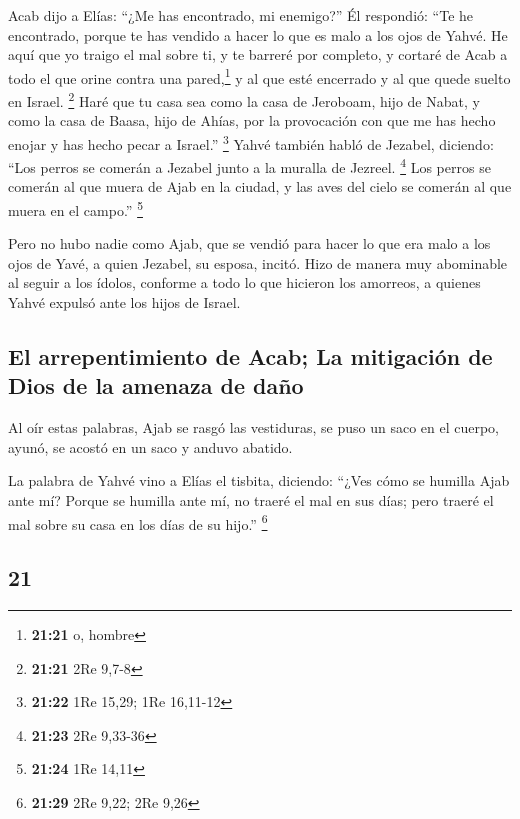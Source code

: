 \begin{paracol}{2}
 Acab dijo a Elías: ``¿Me has encontrado, mi enemigo?''
Él respondió: ``Te he encontrado, porque te has vendido a hacer lo que
es malo a los ojos de Yahvé.  He aquí que yo traigo el
mal sobre ti, y te barreré por completo, y cortaré de Acab a todo el que
orine contra una pared,\footnote{\textbf{21:21} o, hombre} y al que esté
encerrado y al que quede suelto en Israel. \footnote{\textbf{21:21} 2Re
  9,7-8}  Haré que tu casa sea como la casa de Jeroboam,
hijo de Nabat, y como la casa de Baasa, hijo de Ahías, por la
provocación con que me has hecho enojar y has hecho pecar a Israel.''
\footnote{\textbf{21:22} 1Re 15,29; 1Re 16,11-12}  Yahvé
también habló de Jezabel, diciendo: ``Los perros se comerán a Jezabel
junto a la muralla de Jezreel. \footnote{\textbf{21:23} 2Re 9,33-36}
 Los perros se comerán al que muera de Ajab en la ciudad,
y las aves del cielo se comerán al que muera en el campo.'' \footnote{\textbf{21:24}
  1Re 14,11}

 Pero no hubo nadie como Ajab, que se vendió para hacer
lo que era malo a los ojos de Yavé, a quien Jezabel, su esposa, incitó.
 Hizo de manera muy abominable al seguir a los ídolos,
conforme a todo lo que hicieron los amorreos, a quienes Yahvé expulsó
ante los hijos de Israel.

\hypertarget{el-arrepentimiento-de-acab-la-mitigaciuxf3n-de-dios-de-la-amenaza-de-dauxf1o}{%
\subsection{El arrepentimiento de Acab; La mitigación de Dios de la
amenaza de
daño}\label{el-arrepentimiento-de-acab-la-mitigaciuxf3n-de-dios-de-la-amenaza-de-dauxf1o}}

 Al oír estas palabras, Ajab se rasgó las vestiduras, se
puso un saco en el cuerpo, ayunó, se acostó en un saco y anduvo abatido.

 La palabra de Yahvé vino a Elías el tisbita, diciendo:
 ``¿Ves cómo se humilla Ajab ante mí? Porque se humilla
ante mí, no traeré el mal en sus días; pero traeré el mal sobre su casa
en los días de su hijo.'' \footnote{\textbf{21:29} 2Re 9,22; 2Re 9,26}

\switchcolumn
\begin{otherlanguage}{english}

\hypertarget{section-41}{%
\section{21}\label{section-41}}


\end{otherlanguage}
\end{paracol}
